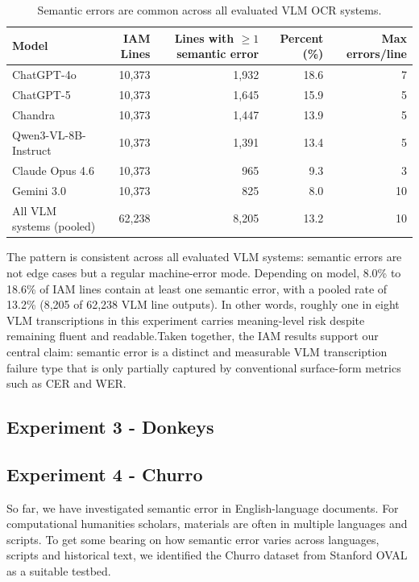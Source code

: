 \documentclass{anthology-ch}         %
\begin{document}
\begin{table}[h]
\centering
\caption{Semantic errors are common across all evaluated VLM OCR systems.}
\label{tab:semantic-errors-common}
\begin{tabular}{lrrrr}
\hline
Model & IAM Lines & Lines with $\geq 1$ semantic error & Percent (\%) & Max errors/line \\
\hline
ChatGPT-4o             & 10,373 & 1,932 & 18.6 & 7 \\
ChatGPT-5              & 10,373 & 1,645 & 15.9 & 5 \\
Chandra                & 10,373 & 1,447 & 13.9 & 5 \\
Qwen3-VL-8B-Instruct   & 10,373 & 1,391 & 13.4 & 5 \\
Claude Opus 4.6          & 10,373 & 965 & 9.3 & 3 \\
Gemini 3.0       & 10,373 & 825 & 8.0 & 10 \\
\hline
All VLM systems (pooled) & 62,238 & 8,205 & 13.2 & 10 \\
\hline
\end{tabular}
\end{table}
The pattern is consistent across all evaluated VLM systems: semantic errors are not edge cases but a regular machine-error mode. Depending on model, 8.0\% to 18.6\% of IAM lines contain at least one semantic error, with a pooled rate of 13.2\% (8,205 of 62,238 VLM line outputs). In other words, roughly one in eight VLM transcriptions in this experiment carries meaning-level risk despite remaining fluent and readable.Taken together, the IAM results support our central claim: semantic error is a distinct and measurable VLM transcription failure type that is only partially captured by conventional surface-form metrics such as CER and WER.



\subsection{Experiment 3 - Donkeys}

\subsection{Experiment 4 - Churro}

So far, we have investigated semantic error in English-language documents.
For computational humanities scholars, materials are often in multiple languages and scripts.
To get some bearing on how semantic error varies across languages, scripts and historical text, we identified the  Churro dataset from Stanford OVAL as a suitable testbed.
\end{document}

